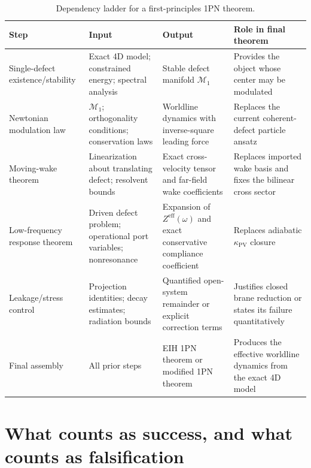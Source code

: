 \documentclass[11pt]{article}
\newcommand{\kPV}{\kappa_{\mathrm{PV}}}
\newcommand{\Seff}{Z^{\mathrm{eff}}}
\begin{document}
\begin{table}[t]
  \centering
  \caption{Dependency ladder for a first-principles 1PN theorem.}
  \label{tab:dependencies}
  \small
  \setlength{\tabcolsep}{5pt}
  \renewcommand{\arraystretch}{1.18}
  \begin{tabularx}{\linewidth}{@{}l L L L@{}}
    \toprule
    Step & Input & Output & Role in final theorem \\
    \midrule
    Single-defect existence/stability & Exact 4D model; constrained energy; spectral analysis & Stable defect manifold $\mathcal M_{1}$ & Provides the object whose center may be modulated \\
    Newtonian modulation law & $\mathcal M_{1}$; orthogonality conditions; conservation laws & Worldline dynamics with inverse-square leading force & Replaces the current coherent-defect particle ansatz \\
    Moving-wake theorem & Linearization about translating defect; resolvent bounds & Exact cross-velocity tensor and far-field wake coefficients & Replaces imported wake basis and fixes the bilinear cross sector \\
    Low-frequency response theorem & Driven defect problem; operational port variables; nonresonance & Expansion of $\Seff(\omega)$ and exact conservative compliance coefficient & Replaces adiabatic $\kPV$ closure \\
    Leakage/stress control & Projection identities; decay estimates; radiation bounds & Quantified open-system remainder or explicit correction terms & Justifies closed brane reduction or states its failure quantitatively \\
    Final assembly & All prior steps & EIH 1PN theorem or modified 1PN theorem & Produces the effective worldline dynamics from the exact 4D model \\
    \bottomrule
  \end{tabularx}
\end{table}

\section{What counts as success, and what counts as falsification}
\label{sec:success}
\end{document}
